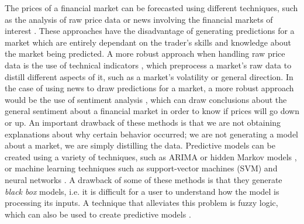 \documentclass{ieeeaccess}
\begin{document}
The prices of a financial market can be forecasted using different
techniques, such as the analysis of raw price data or news involving
the financial markets of interest \cite{Liu2019}. These approaches have
the disadvantage of generating predictions for a market which are
entirely dependant on the trader's skills and knowledge about the
market being predicted. A more robust approach when handling raw price
data is the use of technical indicators \cite{Alsubaie2019}, which
preprocess a market's raw data to distill different aspects of it,
such as a market's volatility or general direction. In the case of
using news to draw predictions for a market, a more robust approach
would be the use of sentiment analysis \cite{LienMinh2018}
\cite{Cabrera2018}, which can draw conclusions about the general
sentiment about a financial market in order to know if prices will go
down or up. An important drawback of these methods is that we 
are not obtaining explanations about why certain behavior occurred; we
are not generating a model about a market, we are simply distilling
the data. Predictive models can be created using a variety of
techniques, such as ARIMA \cite{Idrees2019} or hidden Markov models
\cite{Cao2019}, or machine learning techniques such as support-vector
machines (SVM) \cite{Guo2018} and neural networks \cite{Chen2019a}. A
drawback of some of these methods is that they generate \textit{black
box} models, i.e. it is difficult for a user to understand how the
model is processing its inputs. A technique that alleviates this
problem is fuzzy logic, which can also be used to create predictive
models \cite{Jiang2018} \cite{Sang2019} \cite{Chourmouziadis2019}.


\end{document}
